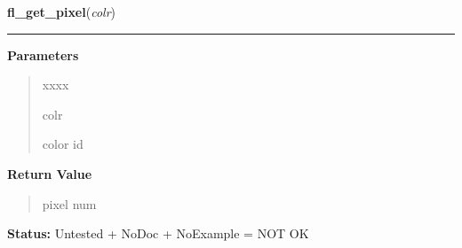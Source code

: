 \hspace{.8\funcindent}\begin{boxedminipage}{\funcwidth}

    \raggedright \textbf{fl\_get\_pixel}(\textit{colr})

    \vspace{-1.5ex}

    \rule{\textwidth}{0.5\fboxrule}
\setlength{\parskip}{2ex}
\setlength{\parskip}{1ex}
      \textbf{Parameters}
      \vspace{-1ex}

      \begin{quote}
        \begin{Ventry}{xxxx}

          \item[colr]

          color id

        \end{Ventry}

      \end{quote}

      \textbf{Return Value}
    \vspace{-1ex}

      \begin{quote}
      pixel num

      \end{quote}

\textbf{Status:} Untested + NoDoc + NoExample = NOT OK



    \end{boxedminipage}

    \label{xformslib:library:fl_get_pixel}

    \vspace{0.5ex}

